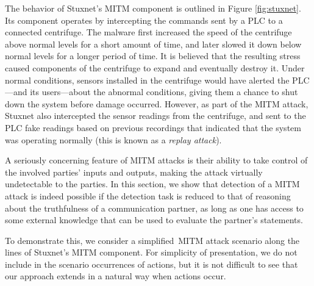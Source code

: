 \documentclass{article}
\begin{document}
%
\begin{figwindow}
\end{figwindow}
The behavior of Stuxnet's MITM component is outlined in Figure \ref{fig:stuxnet}. Its component operates by intercepting the commands sent by a PLC to a connected centrifuge. The malware first increased the speed of the centrifuge above normal levels for a short amount of time, and later slowed it down below normal levels for a longer period of time. It is believed that the resulting stress caused components of the centrifuge to expand and eventually destroy it. Under normal conditions, sensors installed in the centrifuge would have alerted the PLC---and its users---about the abnormal conditions, giving them a chance to shut down the system before damage occurred. However, as part of the MITM attack, Stuxnet also intercepted the sensor readings from the centrifuge, and sent to the PLC fake readings based on previous recordings that indicated that the system was operating normally (this is known as a \emph{replay attack}). 

A seriously concerning feature of MITM attacks is their ability to take control of the involved parties' inputs and outputs, making the attack virtually undetectable to the parties. In this section, we show that detection of a MITM attack is indeed possible if the detection task is reduced to that of reasoning about the truthfulness of a communication partner, as long as one has access to some external knowledge that can be used 
to evaluate
the partner's statements.

To demonstrate this, we consider a simplified\ MITM attack scenario along the lines of Stuxnet's MITM component. For simplicity of presentation, we do not include in the scenario occurrences of actions, but it is not difficult to see that our approach extends in a natural way when actions occur.  %
\end{document}
